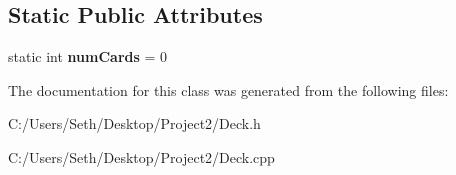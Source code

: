 \subsection*{Static Public Attributes}
\begin{DoxyCompactItemize}
\item 
\mbox{\label{class_deck_a364998d2d2bb52aa71df64dca9844254}} 
static int {\bfseries num\+Cards} = 0
\end{DoxyCompactItemize}


The documentation for this class was generated from the following files\+:\begin{DoxyCompactItemize}
\item 
C\+:/\+Users/\+Seth/\+Desktop/\+Project2/Deck.\+h\item 
C\+:/\+Users/\+Seth/\+Desktop/\+Project2/Deck.\+cpp\end{DoxyCompactItemize}
